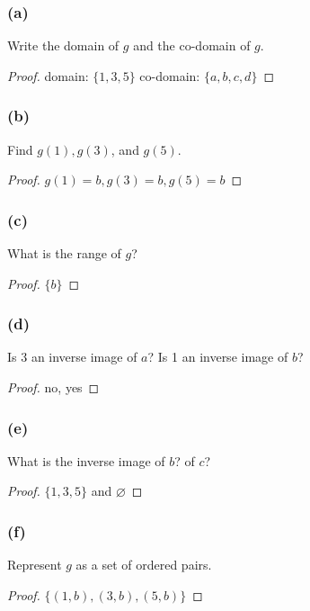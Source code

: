 \documentclass[14pt]{extarticle}
\newcommand{\es}{\varnothing}
\begin{document}
\subsubsection{(a)}
Write the domain of $g$ and the co-domain of $g$.

\begin{proof}
domain: \(\{1, 3, 5\}\) co-domain: \(\{a,b,c,d\}\)
\end{proof}

\subsubsection{(b)}
Find $g(1), g(3)$, and $g(5)$.

\begin{proof}
\(g(1) = b, g(3) = b, g(5) = b\)
\end{proof}

\subsubsection{(c)}
What is the range of $g$?

\begin{proof}
\(\{b\}\)
\end{proof}

\subsubsection{(d)}
Is 3 an inverse image of $a$? Is 1 an inverse image of $b$?

\begin{proof}
no, yes
\end{proof}

\subsubsection{(e)}
What is the inverse image of $b$? of $c$?

\begin{proof}
\(\{1,3,5\}\) and $\es$
\end{proof}

\subsubsection{(f)}
Represent $g$ as a set of ordered pairs.

\begin{proof}
\(\{(1,b),(3,b),(5,b)\}\)
\end{proof}
\end{document}
